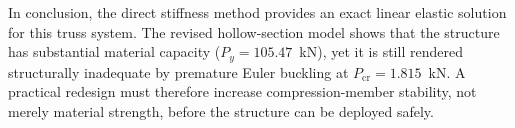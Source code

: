 \documentclass[11pt, a4paper]{article}
\begin{document}
\noindent In conclusion, the direct stiffness method provides an exact linear elastic solution for this truss system.  The revised hollow-section model shows that the structure has substantial material capacity ($P_y = 105.47$~kN), yet it is still rendered structurally inadequate by premature Euler buckling at $P_{\text{cr}} = 1.815$~kN.  A practical redesign must therefore increase compression-member stability, not merely material strength, before the structure can be deployed safely.
\end{document}
